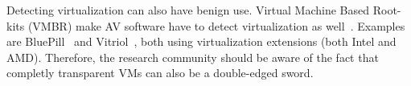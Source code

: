 Detecting virtualization can also have benign use. Virtual Machine Based Root-kits (VMBR) make AV software have to detect virtualization as well~\cite{thompson, ferrie2007}. Examples are BluePill~\cite{bluepill} and Vitriol~\cite{vitriol}, both using virtualization extensions (both Intel and AMD). Therefore, the research community should be aware of the fact that completly transparent VMs can also be a double-edged sword.

